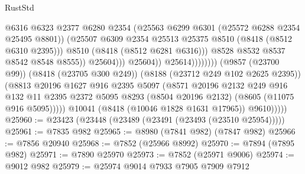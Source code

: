 \begin{lexlean}{RustStd}
\begin{coremodule}
                                                @6316
                                                @6323
                                                @2377
                                                @6280
                                                @2354
                                                (@25563
                                                  @6299
                                                  @6301
                                                  (@25572 @6288 @2354 @25495 @8801))
                                                (@25507
                                                  @6309
                                                  @2354
                                                  @25513
                                                  @25375
                                                  @8510
                                                  (@8418 (@8512 @6310 @2395)))
                                                @8510
                                                (@8418 (@8512 @6281 @6316)))
                                              @8528
                                              @8532
                                              @8537
                                              @8542
                                              @8548
                                              @8555))
                                          @25604)))
                                    @25604))
                                @25614))))))))
                (@9857 (@23700 @99))
                (@8418 (@23705 @300 @249))
                (@8188 (@23712 @249 @102 @2625 @2395))
                (@8813
                  @20196
                  @1627
                  @916
                  @2395
                  @5097
                  (@8571
                    @20196
                    @2132
                    @249
                    @916
                    @132
                    @11
                    @2395
                    @2372
                    @5095
                    @8293
                    (@8504 @20196 @2132)
                    (@8605 (@11075 @916 @5095)))))
              @10041
              (@8418 (@10046 @1828 @1631 @17965))
              @9610)))))
@25960 := @23423 (@23448 (@23489 (@23491 (@23493 (@23510 @25954)))))
@25961 := @7835 @982
@25965 := @8980 (@7841 @982) (@7847 @982)
@25966 := @7856 @20940
@25968 := @7852 (@25966 @8992)
@25970 := @7894 (@7895 @982)
@25971 := @7890 @25970
@25973 := @7852 (@25971 @9006)
@25974 := @9012 @982
@25979 := @25974 @9014 @7933 @7905 @7909 @7912

\end{coremodule}
\end{lexlean}
